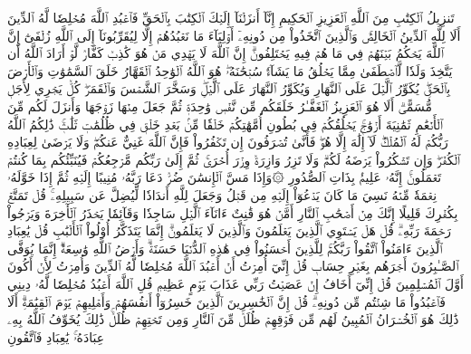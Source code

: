 تَنزِيلُ ٱلۡكِتَٰبِ مِنَ ٱللَّهِ ٱلۡعَزِيزِ ٱلۡحَكِيمِ
إِنَّآ أَنزَلۡنَآ إِلَيۡكَ ٱلۡكِتَٰبَ بِٱلۡحَقِّ فَٱعۡبُدِ ٱللَّهَ مُخۡلِصٗا لَّهُ ٱلدِّينَ
أَلَا لِلَّهِ ٱلدِّينُ ٱلۡخَالِصُۚ وَٱلَّذِينَ ٱتَّخَذُواْ مِن دُونِهِۦٓ أَوۡلِيَآءَ مَا نَعۡبُدُهُمۡ إِلَّا لِيُقَرِّبُونَآ إِلَى ٱللَّهِ زُلۡفَىٰٓ إِنَّ ٱللَّهَ يَحۡكُمُ بَيۡنَهُمۡ فِي مَا هُمۡ فِيهِ يَخۡتَلِفُونَۗ إِنَّ ٱللَّهَ لَا يَهۡدِي مَنۡ هُوَ كَٰذِبٞ كَفَّارٞ
لَّوۡ أَرَادَ ٱللَّهُ أَن يَتَّخِذَ وَلَدٗا لَّٱصۡطَفَىٰ مِمَّا يَخۡلُقُ مَا يَشَآءُۚ سُبۡحَٰنَهُۥۖ هُوَ ٱللَّهُ ٱلۡوَٰحِدُ ٱلۡقَهَّارُ
خَلَقَ ٱلسَّمَٰوَٰتِ وَٱلۡأَرۡضَ بِٱلۡحَقِّۖ يُكَوِّرُ ٱلَّيۡلَ عَلَى ٱلنَّهَارِ وَيُكَوِّرُ ٱلنَّهَارَ عَلَى ٱلَّيۡلِۖ وَسَخَّرَ ٱلشَّمۡسَ وَٱلۡقَمَرَۖ كُلّٞ يَجۡرِي لِأَجَلٖ مُّسَمًّىۗ أَلَا هُوَ ٱلۡعَزِيزُ ٱلۡغَفَّـٰرُ
خَلَقَكُم مِّن نَّفۡسٖ وَٰحِدَةٖ ثُمَّ جَعَلَ مِنۡهَا زَوۡجَهَا وَأَنزَلَ لَكُم مِّنَ ٱلۡأَنۡعَٰمِ ثَمَٰنِيَةَ أَزۡوَٰجٖۚ يَخۡلُقُكُمۡ فِي بُطُونِ أُمَّهَٰتِكُمۡ خَلۡقٗا مِّنۢ بَعۡدِ خَلۡقٖ فِي ظُلُمَٰتٖ ثَلَٰثٖۚ ذَٰلِكُمُ ٱللَّهُ رَبُّكُمۡ لَهُ ٱلۡمُلۡكُۖ لَآ إِلَٰهَ إِلَّا هُوَۖ فَأَنَّىٰ تُصۡرَفُونَ
إِن تَكۡفُرُواْ فَإِنَّ ٱللَّهَ غَنِيٌّ عَنكُمۡۖ وَلَا يَرۡضَىٰ لِعِبَادِهِ ٱلۡكُفۡرَۖ وَإِن تَشۡكُرُواْ يَرۡضَهُ لَكُمۡۗ وَلَا تَزِرُ وَازِرَةٞ وِزۡرَ أُخۡرَىٰۚ ثُمَّ إِلَىٰ رَبِّكُم مَّرۡجِعُكُمۡ فَيُنَبِّئُكُم بِمَا كُنتُمۡ تَعۡمَلُونَۚ إِنَّهُۥ عَلِيمُۢ بِذَاتِ ٱلصُّدُورِ
۞وَإِذَا مَسَّ ٱلۡإِنسَٰنَ ضُرّٞ دَعَا رَبَّهُۥ مُنِيبًا إِلَيۡهِ ثُمَّ إِذَا خَوَّلَهُۥ نِعۡمَةٗ مِّنۡهُ نَسِيَ مَا كَانَ يَدۡعُوٓاْ إِلَيۡهِ مِن قَبۡلُ وَجَعَلَ لِلَّهِ أَندَادٗا لِّيُضِلَّ عَن سَبِيلِهِۦۚ قُلۡ تَمَتَّعۡ بِكُفۡرِكَ قَلِيلًا إِنَّكَ مِنۡ أَصۡحَٰبِ ٱلنَّارِ
أَمَّنۡ هُوَ قَٰنِتٌ ءَانَآءَ ٱلَّيۡلِ سَاجِدٗا وَقَآئِمٗا يَحۡذَرُ ٱلۡأٓخِرَةَ وَيَرۡجُواْ رَحۡمَةَ رَبِّهِۦۗ قُلۡ هَلۡ يَسۡتَوِي ٱلَّذِينَ يَعۡلَمُونَ وَٱلَّذِينَ لَا يَعۡلَمُونَۗ إِنَّمَا يَتَذَكَّرُ أُوْلُواْ ٱلۡأَلۡبَٰبِ
قُلۡ يَٰعِبَادِ ٱلَّذِينَ ءَامَنُواْ ٱتَّقُواْ رَبَّكُمۡۚ لِلَّذِينَ أَحۡسَنُواْ فِي هَٰذِهِ ٱلدُّنۡيَا حَسَنَةٞۗ وَأَرۡضُ ٱللَّهِ وَٰسِعَةٌۗ إِنَّمَا يُوَفَّى ٱلصَّـٰبِرُونَ أَجۡرَهُم بِغَيۡرِ حِسَابٖ
قُلۡ إِنِّيٓ أُمِرۡتُ أَنۡ أَعۡبُدَ ٱللَّهَ مُخۡلِصٗا لَّهُ ٱلدِّينَ
وَأُمِرۡتُ لِأَنۡ أَكُونَ أَوَّلَ ٱلۡمُسۡلِمِينَ
قُلۡ إِنِّيٓ أَخَافُ إِنۡ عَصَيۡتُ رَبِّي عَذَابَ يَوۡمٍ عَظِيمٖ
قُلِ ٱللَّهَ أَعۡبُدُ مُخۡلِصٗا لَّهُۥ دِينِي
فَٱعۡبُدُواْ مَا شِئۡتُم مِّن دُونِهِۦۗ قُلۡ إِنَّ ٱلۡخَٰسِرِينَ ٱلَّذِينَ خَسِرُوٓاْ أَنفُسَهُمۡ وَأَهۡلِيهِمۡ يَوۡمَ ٱلۡقِيَٰمَةِۗ أَلَا ذَٰلِكَ هُوَ ٱلۡخُسۡرَانُ ٱلۡمُبِينُ
لَهُم مِّن فَوۡقِهِمۡ ظُلَلٞ مِّنَ ٱلنَّارِ وَمِن تَحۡتِهِمۡ ظُلَلٞۚ ذَٰلِكَ يُخَوِّفُ ٱللَّهُ بِهِۦ عِبَادَهُۥۚ يَٰعِبَادِ فَٱتَّقُونِ
